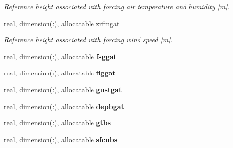 \begin{DoxyCompactItemize}
\begin{DoxyCompactList}\small\item\em Reference height associated with forcing air temperature and humidity \mbox{[}m\mbox{]}. \end{DoxyCompactList}\item 
\hypertarget{structclass__statevars_1_1class__gather_ab403f1119d39a87a8a519136d329e97d}{}real, dimension(\+:), allocatable \hyperlink{structclass__statevars_1_1class__gather_ab403f1119d39a87a8a519136d329e97d}{zrfmgat}\label{structclass__statevars_1_1class__gather_ab403f1119d39a87a8a519136d329e97d}

\begin{DoxyCompactList}\small\item\em Reference height associated with forcing wind speed \mbox{[}m\mbox{]}. \end{DoxyCompactList}\item 
\hypertarget{structclass__statevars_1_1class__gather_a59b4fa3e72e5769e07da8cab44b75ea4}{}real, dimension(\+:), allocatable {\bfseries fsggat}\label{structclass__statevars_1_1class__gather_a59b4fa3e72e5769e07da8cab44b75ea4}

\item 
\hypertarget{structclass__statevars_1_1class__gather_a0caee408db2ba0c01b07f2f90d4945d1}{}real, dimension(\+:), allocatable {\bfseries flggat}\label{structclass__statevars_1_1class__gather_a0caee408db2ba0c01b07f2f90d4945d1}

\item 
\hypertarget{structclass__statevars_1_1class__gather_a0e570f49e7f033fa9e6ea1400f1ba834}{}real, dimension(\+:), allocatable {\bfseries gustgat}\label{structclass__statevars_1_1class__gather_a0e570f49e7f033fa9e6ea1400f1ba834}

\item 
\hypertarget{structclass__statevars_1_1class__gather_ac19091a8576db891169ae7612616dda1}{}real, dimension(\+:), allocatable {\bfseries depbgat}\label{structclass__statevars_1_1class__gather_ac19091a8576db891169ae7612616dda1}

\item 
\hypertarget{structclass__statevars_1_1class__gather_acf1f6f6f8211b36eaa51dce7a7e2ad05}{}real, dimension(\+:), allocatable {\bfseries gtbs}\label{structclass__statevars_1_1class__gather_acf1f6f6f8211b36eaa51dce7a7e2ad05}

\item 
\hypertarget{structclass__statevars_1_1class__gather_ab69e6f681aa61e47b587f9cde60fa41d}{}real, dimension(\+:), allocatable {\bfseries sfcubs}\label{structclass__statevars_1_1class__gather_ab69e6f681aa61e47b587f9cde60fa41d}


\end{DoxyCompactItemize}
